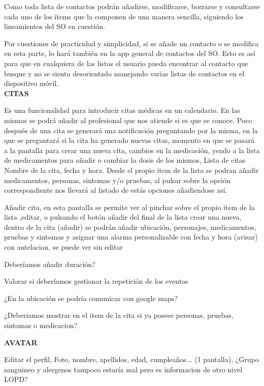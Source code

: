 \documentclass[../pfc.tex]{subfiles}
\begin{document}
	Como toda lista de contactos podrán añadirse, modificarse, borrarse y consultarse cada uno de los ítems que la componen de una manera sencilla, siguiendo los lineamientos del SO en cuestión.
	
	Por cuestiones de practicidad y simplicidad, si se añade un contacto o se modifica en esta parte, lo hará también en la app general de contactos del SO. Esto es así para que en cualquiera de las listas el usuario pueda encontrar al contacto que busque y no se sienta desorientado manejando varias listas de contactos en el dispositivo móvil. \\
	
	\textbf{CITAS}
	
	Es una funcionalidad para introducir citas médicas en un calendario. En las mismas se podrá añadir al profesional que nos atiende si es que se conoce. 
	Poco después de una cita se generará una notificación preguntando por la misma, en la que se preguntará si la cita ha generado nuevas citas, momento en que se pasará a la pantalla para crear una nueva cita, cambios en la medicación, yendo a la lista de medicamentos para añadir o cambiar la dosis de los mismos, 
	Lista de citas Nombre de la cita, fecha y hora.
	Desde el propio item de la lista se podran añadir medicamentos, personas, sintomas y/o pruebas, al pulsar sobre la opción correspondiente nos llevará al listado de estás opciones añadiendose así.
	
	Añadir cita, en esta pantalla se permite ver al pinchar sobre el propio item de la lista ,editar, o pulsando el botón añadir del final de la lista crear una nueva, 
	dentro de la cita (añadir) se podrán añadir ubicación, personajes, medicamentos, pruebas y sintomas y asignar una alarma personalizable con fecha y hora (avisar) con antelacion.
	se puede ver sin editar

	
	Deberíamos añadir duración?

	
	Valorar si deberíamos gestionar la repetición de los eventos

	
	¿En la ubicación se podría comunicar con google maps?

	
	¿Deberiamos mostrar en el item de la cita si ya poseee personas, pruebas, sintomas o medicacion?







	\textbf{AVATAR}
	
	Editar el perfil, Foto, nombre, apellidos, edad, cumpleaños... (1 pantalla), ¿Grupo sanguineo y alergenos tampoco estaría mal pero es informacion de otro nivel LOPD?
	
\end{document}
